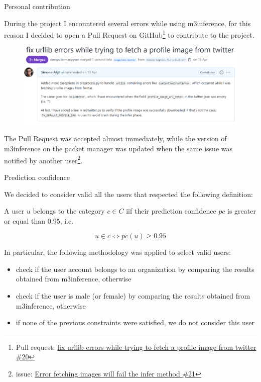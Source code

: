 \documentclass[8pt]{beamer}  %
\begin{document}
\begin{frame}{Personal contribution}

	During the project I encountered several errors while using m3inference, for this reason I decided to open a Pull Request on GitHub\footnote{Pull request: \href{https://github.com/euagendas/m3inference/pull/20}{fix urllib errors while trying to fetch a profile image from twitter \#20}} to contribute to the project.
	
	\begin{figure}
	    \centering
	    \includegraphics[scale=0.165]{assets/img/pull_request.png}
	\end{figure}
	
	The Pull Request was accepted almost immediately, while the version of m3inference on the packet manager was updated when the same issue was notified by another user\footnote{issue: \href{https://github.com/euagendas/m3inference/issues/21}{Error fetching images will fail the infer method \#21}}.
	
\end{frame}

\begin{frame}{Prediction confidence}

    We decided to consider valid all the users that respected the following definition:

    \begin{definition}
        A user \(u\) belongs to the category \(c \in C\) iif their prediction confidence \(pc\) is greater or equal than 0.95, i.e.
	    
	    \[u \in c \Longleftrightarrow pc(u) \geq 0.95\]
	\end{definition}
	
	In particular, the following methodology was applied to select valid users:
	
	\begin{itemize}
	    \item check if the user account belongs to an organization by comparing the results obtained from m3inference, otherwise
	    \item check if the user is male (or female) by comparing the results obtained from m3inference, otherwise
	    \item if none of the previous constraints were satisfied, we do not consider this user
	\end{itemize}
	
\end{frame}
\end{document}
